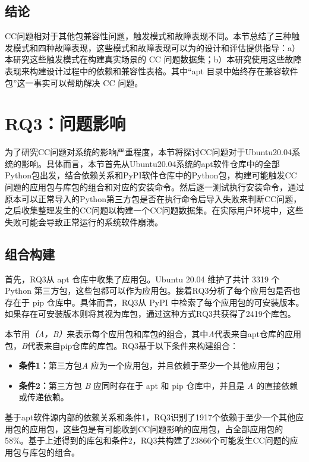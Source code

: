 
\subsection{结论}
CC问题相对于其他包兼容性问题，触发模式和故障表现不同。本节总结了三种触发模式和四种故障表现，这些模式和故障表现可以为\tool{}的设计和评估提供指导：a）本研究这些触发模式在构建真实场景的 CC 问题数据集；b）本研究使用这些故障表现来构建\tool{}设计过程中的依赖和兼容性表格。其中“apt 目录中始终存在兼容软件包”这一事实可以帮助\tool{}解决 CC 问题。

\section{RQ3：问题影响}\label{3.4}
为了研究CC问题对系统的影响严重程度，本节将探讨CC问题对于Ubuntu20.04系统的影响。具体而言，本节首先从Ubuntu20.04系统的apt软件仓库中的全部Python包出发，结合依赖关系和PyPI软件仓库中的Python包，构建可能触发CC问题的应用包与库包的组合和对应的安装命令。然后逐一测试执行安装命令，通过原本可以正常导入的Python第三方包是否在执行命令后导入失败来判断CC问题，之后收集整理发生的CC问题以构建一个CC问题数据集。在实际用户环境中，这些失败可能会导致正常运行的系统软件崩溃。

\subsection{组合构建}
首先，RQ3从 apt 仓库中收集了应用包。Ubuntu 20.04 维护了共计 3319 个 Python 第三方包，这些包都可以作为应用包。接着RQ3分析了每个应用包是否也存在于 pip 仓库中。具体而言，RQ3从 PyPI 中检索了每个应用包的可安装版本。如果存在可安装版本则将其视为库包，通过这种方式RQ3共获得了2419个库包。

本节用\textit{（A，B）}来表示每个应用包和库包的组合，其中\textit{A}代表来自apt仓库的应用包，\textit{B}代表来自pip仓库的库包。RQ3基于以下条件来构建组合：
\begin{itemize}
	\item \textbf{条件1：}第三方包\textit{A} 应为一个应用包，并且依赖于至少一个其他应用包；
	\item \textbf{条件2：}第三方包 \textit{B} 应同时存在于 apt 和 pip 仓库中，并且是 \textit{A} 的直接依赖或传递依赖。
\end{itemize}
基于apt软件源内部的依赖关系和条件1，RQ3识别了1917个依赖于至少一个其他应用包的应用包，这些包是有可能收到CC问题影响的应用包，占全部应用包的58\%。基于上述得到的库包和条件2，RQ3共构建了23866个可能发生CC问题的应用包与库包的组合。


